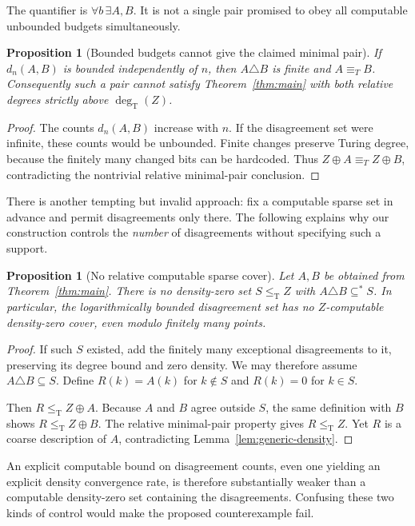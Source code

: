 \documentclass[11pt,a4paper]{article}
\newcommand{\leT}{\leq_{\mathrm T}}
\newcommand{\degT}{\operatorname{deg}_{\mathrm T}}
\newtheorem{proposition}[theorem]{Proposition}
\theoremstyle{definition}\newtheorem{definition}[theorem]{Definition}
\theoremstyle{remark}\newtheorem{remark}[theorem]{Remark}
\begin{document}
The quantifier is $\forall b\,\exists A,B$. It is not a single pair promised to obey all computable unbounded budgets simultaneously.

\begin{proposition}[Bounded budgets cannot give the claimed minimal pair]
\label{prop:bounded}
If $d_n(A,B)$ is bounded independently of $n$, then $A\triangle B$ is finite and $A\equiv_T B$. Consequently such a pair cannot satisfy Theorem~\ref{thm:main} with both relative degrees strictly above $\degT(Z)$.
\end{proposition}
\begin{proof}
The counts $d_n(A,B)$ increase with $n$. If the disagreement set were infinite, these counts would be unbounded. Finite changes preserve Turing degree, because the finitely many changed bits can be hardcoded. Thus $Z\oplus A\equiv_T Z\oplus B$, contradicting the nontrivial relative minimal-pair conclusion.
\end{proof}

There is another tempting but invalid approach: fix a computable sparse set in advance and permit disagreements only there. The following explains why our construction controls the \emph{number} of disagreements without specifying such a support.

\begin{proposition}[No relative computable sparse cover]
\label{prop:no-cover}
Let $A,B$ be obtained from Theorem~\ref{thm:main}. There is no density-zero set $S\leT Z$ with $A\triangle B\subseteq^* S$. In particular, the logarithmically bounded disagreement set has no $Z$-computable density-zero cover, even modulo finitely many points.
\end{proposition}
\begin{proof}
If such $S$ existed, add the finitely many exceptional disagreements to it, preserving its degree bound and zero density. We may therefore assume $A\triangle B\subseteq S$. Define $R(k)=A(k)$ for $k\notin S$ and $R(k)=0$ for $k\in S$.

Then $R\leT Z\oplus A$. Because $A$ and $B$ agree outside $S$, the same definition with $B$ shows $R\leT Z\oplus B$. The relative minimal-pair property gives $R\leT Z$. Yet $R$ is a coarse description of $A$, contradicting Lemma~\ref{lem:generic-density}.
\end{proof}

An explicit computable bound on disagreement counts, even one yielding an explicit density convergence rate, is therefore substantially weaker than a computable density-zero set containing the disagreements. Confusing these two kinds of control would make the proposed counterexample fail.
\end{document}
